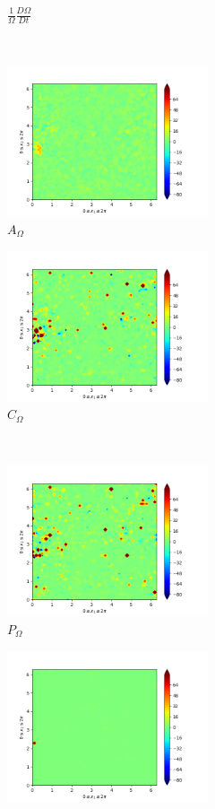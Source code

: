 \begin{figure}[H]
\begin{subfigure}[H]{0.45\textwidth}
        \caption{$\frac{1}{\Omega} \frac{D \Omega}{Dt}$}
    \end{subfigure}
    ~
    \begin{subfigure}{0.45\textwidth}
        \includegraphics[height=1.75in]{media/run-cds-65/A-enst-1480.png}
        \caption{$A_{\Omega}$}
    \end{subfigure}
    \newline
    \begin{subfigure}{0.45\textwidth}
        \includegraphics[height=1.75in]{media/run-cds-65/Pi-enst-1480.png}
        \caption{$C_{\Omega}$}
    \end{subfigure}
    ~
    \begin{subfigure}{0.45\textwidth}
        \includegraphics[height=1.75in]{media/run-cds-65/P-enst-1480.png}
        \caption{$P_{\Omega}$}
    \end{subfigure}
    \newline
    \begin{subfigure}{0.45\textwidth}
        \includegraphics[height=1.75in]{media/run-cds-65/B-enst-1480.png}

\end{subfigure}
\end{figure}

